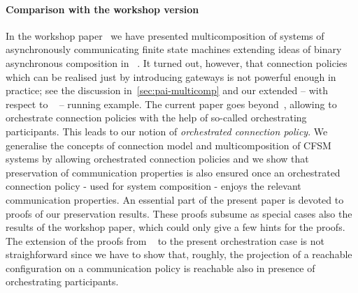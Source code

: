 \paragraph{Comparison with the workshop version}
In the workshop paper~\cite{BH24} we have presented multicomposition of systems of asynchronously
communicating finite state machines extending ideas of binary asynchronous composition in ~\cite{BdLH19}.
It turned out, however, that connection policies which can be realised just by introducing gateways is not powerful enough in practice; see the discussion in~\cref{sec:pai-multicomp}
and our extended -- with respect to ~\cite{BH24} -- running example.
The current paper goes beyond~\cite{BH24}, allowing to orchestrate connection policies with the help of so-called orchestrating participants. This leads to our notion of \emph{orchestrated connection policy}. We generalise the concepts of connection model and multicomposition of CFSM systems by allowing orchestrated connection policies and we show that preservation of communication properties is also ensured once an orchestrated connection policy - used for system composition -
enjoys the relevant communication properties. An essential part of the present paper is devoted to proofs
of our preservation results. These proofs subsume as special cases also the results of the workshop paper, which could only give a few hints for the proofs. 
The extension of the proofs from ~\cite{BH24} to the present orchestration case is not straighforward since we have to show that, roughly, the projection of
a reachable configuration on a communication policy is reachable also in presence of orchestrating 
participants.  










